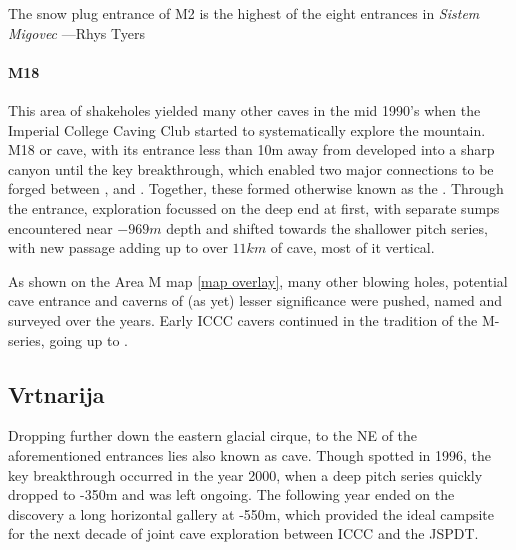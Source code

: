 \begin{marginfigure}
\checkoddpage \ifoddpage \forcerectofloat \else \forceversofloat \fi
\centering
 \caption{The snow plug entrance of M2 is the highest of the eight entrances in \emph{Sistem Migovec} ---Rhys Tyers}
 \label{surfaceM2}
\end{marginfigure}

\paragraph{M18} This area of shakeholes yielded many other caves in the mid 1990's when the Imperial College Caving Club started to systematically explore the mountain. M18 or  cave, with its entrance less than 10m away from  developed into a sharp canyon until the key  breakthrough, which enabled two major connections to be forged between ,  and . Together, these formed  otherwise known as the . Through the  entrance, exploration focussed on the deep end at first, with separate sumps encountered near $-969m$ depth and shifted towards the shallower pitch series, with new passage adding up to over $11km$ of cave, most of it vertical.

As shown on the Area M map \ref{map overlay}, many other blowing holes, potential cave entrance and caverns of (as yet) lesser significance were pushed, named and surveyed over the years. Early ICCC cavers continued in the tradition of the M-series, going up to . 

\subsection{Vrtnarija} Dropping further down the eastern glacial cirque, to the NE of the aforementioned entrances lies  also known as   cave. Though spotted in 1996, the key breakthrough occurred in the year 2000, when a deep pitch series quickly dropped to -350m and was left ongoing. The following year ended on the discovery a long horizontal gallery at -550m, which provided the ideal campsite for the next decade of joint cave exploration between ICCC and the JSPDT.

